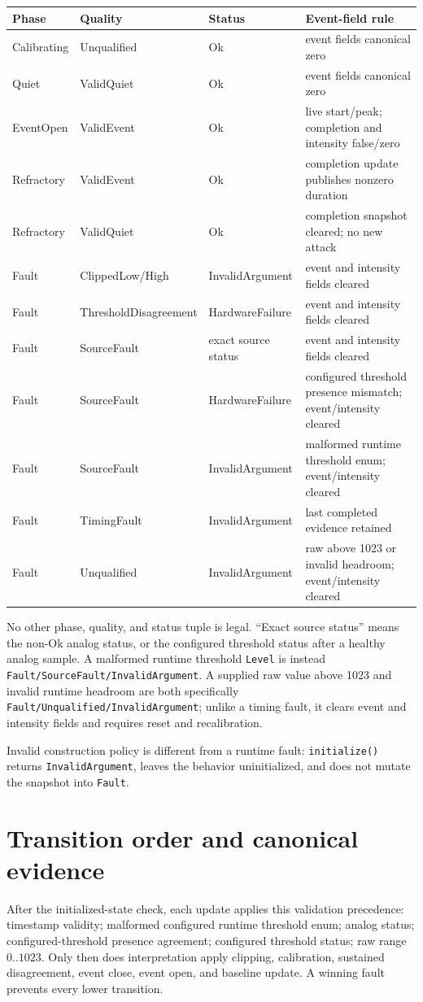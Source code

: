 \documentclass[11pt]{article}
\begin{document}
\begin{tabularx}{\linewidth}{@{}l l l X@{}}
\toprule
Phase & Quality & Status & Event-field rule\\
\midrule
Calibrating & Unqualified & Ok & event fields canonical zero\\
Quiet & ValidQuiet & Ok & event fields canonical zero\\
EventOpen & ValidEvent & Ok & live start/peak; completion and intensity false/zero\\
Refractory & ValidEvent & Ok & completion update publishes nonzero duration\\
Refractory & ValidQuiet & Ok & completion snapshot cleared; no new attack\\
Fault & ClippedLow/High & InvalidArgument & event and intensity fields cleared\\
Fault & ThresholdDisagreement & HardwareFailure & event and intensity fields cleared\\
Fault & SourceFault & exact source status & event and intensity fields cleared\\
Fault & SourceFault & HardwareFailure & configured threshold presence mismatch; event/intensity cleared\\
Fault & SourceFault & InvalidArgument & malformed runtime threshold enum; event/intensity cleared\\
Fault & TimingFault & InvalidArgument & last completed evidence retained\\
Fault & Unqualified & InvalidArgument & raw above 1023 or invalid headroom; event/intensity cleared\\
\bottomrule
\end{tabularx}

No other phase, quality, and status tuple is legal. ``Exact source status''
means the non-Ok analog status, or the configured threshold status after a
healthy analog sample. A malformed runtime threshold \texttt{Level} is instead
\texttt{Fault/SourceFault/InvalidArgument}. A supplied raw value above 1023
and invalid runtime headroom are both specifically
\texttt{Fault/Unqualified/InvalidArgument}; unlike a timing fault, it clears
event and intensity fields and requires reset and recalibration.

Invalid construction policy is different from a runtime fault:
\texttt{initialize()} returns \texttt{InvalidArgument}, leaves the behavior
uninitialized, and does not mutate the snapshot into \texttt{Fault}.

\section{Transition order and canonical evidence}
After the initialized-state check, each update applies this validation
precedence: timestamp validity; malformed configured runtime threshold enum;
analog status; configured-threshold presence agreement; configured threshold
status; raw range \(0..1023\). Only then does interpretation apply clipping,
calibration, sustained disagreement, event close, event open, and baseline
update. A winning fault prevents every lower transition.
\end{document}
